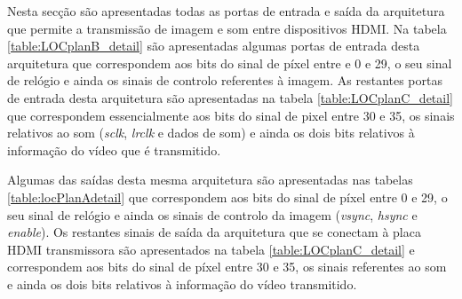 %
Nesta secção são apresentadas todas as portas de entrada e saída da arquitetura que permite a transmissão de imagem e som entre dispositivos HDMI. Na tabela \ref{table:LOCplanB_detail} são apresentadas algumas portas de entrada desta arquitetura que correspondem aos bits do sinal de píxel entre e 0 e 29, o seu sinal de relógio e ainda os sinais de controlo referentes à imagem. As restantes portas de entrada desta arquitetura são apresentadas na tabela \ref{table:LOCplanC_detail} que correspondem essencialmente aos bits do sinal de pixel entre 30 e 35, os sinais relativos ao som (\textit{sclk}, \textit{lrclk} e dados de som) e ainda os dois bits relativos à informação do vídeo que é transmitido.

Algumas das saídas desta mesma arquitetura são apresentadas nas tabelas \ref{table:locPlanAdetail} que correspondem aos bits do sinal de píxel entre 0 e 29, o seu sinal de relógio e ainda os sinais de controlo da imagem (\textit{vsync}, \textit{hsync} e \textit{enable}). Os restantes sinais de saída da arquitetura que se conectam à placa HDMI transmissora são apresentados na tabela \ref{table:LOCplanC_detail} e correspondem aos bits do sinal de píxel entre 30 e 35, os sinais referentes ao som e ainda os dois bits relativos à informação do vídeo transmitido.

